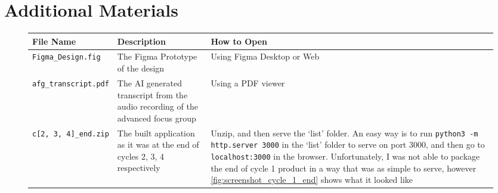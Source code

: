\chapter{Additional Materials}
\label{appx:additional_mats}
\begin{figure}[h]
    \centering
    \begin{tabular}{|m{4cm}|p{5cm}|>{\raggedright\arraybackslash}p{5.5cm}|}
        \hline \textbf{File Name} & \textbf{Description} & \textbf{How to Open} \\ \hline
        \verb|Figma_Design.fig| & The Figma Prototype of the design & Using Figma Desktop or Web\\ \hline
        \verb|afg_transcript.pdf| & The AI generated transcript from the audio recording of the advanced focus group & Using a PDF viewer\\ \hline
        \verb|c[2, 3, 4]_end.zip| & The built application as it was at the end of cycles 2, 3, 4 respectively & Unzip, and then serve the `list' folder. \newline An easy way is to run \verb|python3 -m http.server 3000| in the `list' folder to serve on port 3000, and then go to \verb|localhost:3000| in the browser. Unfortunately, I was not able to package the end of cycle 1 product in a way that was as simple to serve, however \ref{fig:screenshot_cycle_1_end} shows what it looked like\\ \hline
    \end{tabular}
\end{figure}
